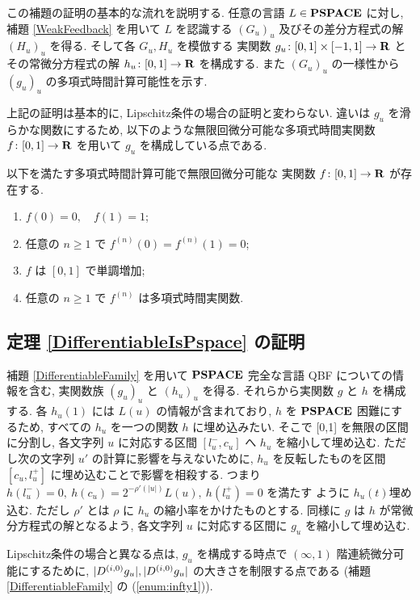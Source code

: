  この補題の証明の基本的な流れを説明する.
 任意の言語 $L \in \mathbf{PSPACE}$ に対し, 
 補題 \ref{WeakFeedback} を用いて $L$ を認識する $(G_u)_u$ 
 及びその差分方程式の解 $(H_u)_u$ を得る.
 そして各 $G_u, H_u$ を模倣する
 実関数 $g_u \colon [0,1] \times [-1, 1] \to \mathbf R$ 
 とその常微分方程式の解 $h_u \colon [0,1] \to \mathbf R$ を構成する.
 また $(G_u)_u$ の一様性から $(g_u)_u$ の多項式時間計算可能性を示す.


 上記の証明は基本的に, Lipschitz条件の場合の証明と変わらない.
 違いは $g_u$ を滑らかな関数にするため, 
 以下のような無限回微分可能な多項式時間実関数 $f \colon [0,1] \to \mathbf R$ を用いて
 $g_u$ を構成している点である.

 \begin{lemma}
  \label{SmoothFunction}
  以下を満たす多項式時間計算可能で無限回微分可能な
  実関数 $f \colon [0,1] \to \mathbf R$ が存在する.
  \begin{enumerate}
   \item $f(0) = 0, \quad f(1) = 1$;
   \item 任意の $n \ge 1$ で $f^{(n)}(0) = f^{(n)}(1) = 0$;
   \item $f$ は $[0,1]$ で単調増加;
   \item 任意の $n \ge 1$ で $f^{(n)}$ は多項式時間実関数.
  \end{enumerate}
 \end{lemma} 


\subsection{定理 \ref{DifferentiableIsPspace} の証明}

 補題 \ref{DifferentiableFamily} を用いて
 $\mathbf{PSPACE}$ 完全な言語 {\sf QBF} についての情報を含む,
 実関数族 $(g_u)_u$ と $(h_u)_u$ を得る.
 それらから実関数 $g$ と $h$ を構成する.
 各 $h_u(1)$ には $L(u)$ の情報が含まれており,
 $h$ を $\mathbf{PSPACE}$ 困難にするため, 
 すべての $h_u$ を一つの関数 $h$ に埋め込みたい.
 そこで [0,1] を無限の区間に分割し, 各文字列 $u$ に対応する区間
 $[l^-_u, c_u]$ へ $h_u$ を縮小して埋め込む. 
 ただし次の文字列 $u'$ の計算に影響を与えないために,
 $h_u$ を反転したものを区間 $[c_u, l^+_u]$ に埋め込むことで影響を相殺する.
 つまり $h(l^-_u) = 0,\ h(c_u) = 2^{-\rho'(|u|)} L(u),\ h(l^+_u) = 0$ を満たす
 ように $h_u(t)$埋め込む.
 ただし $\rho'$ とは $\rho$ に $h_u$ の縮小率をかけたものとする.
 同様に $g$ は $h$ が常微分方程式の解となるよう,
 各文字列 $u$ に対応する区間に $g_u$ を縮小して埋め込む.

 Lipschitz条件の場合と異なる点は, $g_u$ を構成する時点で
 $(\infty, 1)$ 階連続微分可能にするために,
 $|D ^{(i, 0)} g_u|, |D ^{(i, 0)} g_u|$ の大きさを制限する点である
 (補題 \ref{DifferentiableFamily} の (\ref{enum:infty1})).
 
